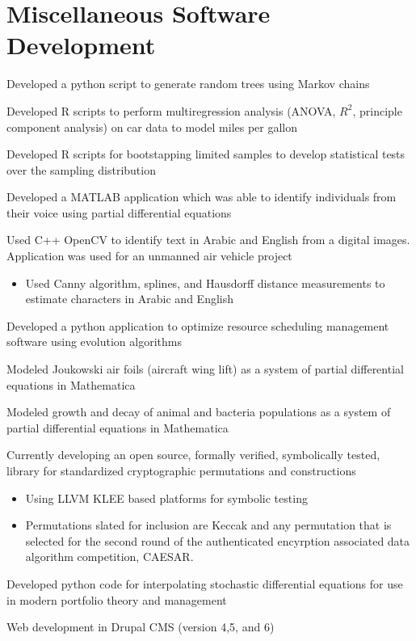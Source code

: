 \documentclass[letterpaper]{clinton-resume}
\begin{document}
\begin{minipage}[t]{0.66\textwidth}

\section{Miscellaneous Software Development}
\vspace{\topsep}
\begin{tightitemize}
\item Developed a python script to generate random trees using Markov chains
\item Developed R scripts to perform multiregression analysis (ANOVA, $R^2$, principle component analysis)  on car data to model miles per gallon
\item Developed R scripts for bootstapping limited samples to develop statistical tests over the sampling distribution
\item Developed a MATLAB application which was able to identify individuals from their voice using partial differential equations
\item Used C++ OpenCV to identify text in Arabic and English from a digital images.  Application was used for an unmanned air vehicle project
\begin{itemize}
\item Used Canny algorithm, splines, and Hausdorff distance measurements to estimate characters in Arabic and English
\end{itemize}
\item Developed a python application to optimize resource scheduling management software using evolution algorithms
\item Modeled Joukowski air foils (aircraft wing lift) as a system of partial differential equations in Mathematica
\item Modeled growth and decay of animal and bacteria populations as a system of partial differential equations in Mathematica
\end{tightitemize}
\vspace{\topsep}
\begin{tightitemize}
\item Currently developing an open source, formally verified, symbolically tested, library for standardized cryptographic permutations and constructions
	\begin{itemize}
	\item Using LLVM KLEE based platforms for symbolic testing
	\item Permutations slated for inclusion are Keccak and any permutation that is selected for the second round of the authenticated encyrption associated data algorithm competition, CAESAR.
	\end{itemize}
\item Developed python code for interpolating stochastic differential equations for use in modern portfolio theory and management
\item Web development in Drupal CMS (version 4,5, and 6)
\end{tightitemize}
\end{minipage}
\end{document}
